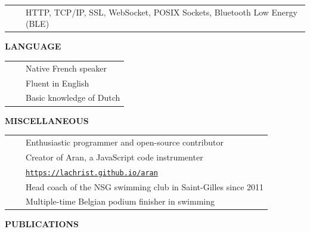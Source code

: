 \documentclass[a4paper,11pt,english]{article}
\newcommand{\LeftColumn}[0]{6.0cm}
\newcommand{\MarginColumn}[0]{28pt}
\newcommand{\RightColumn}[0]{10.5cm}
\newcommand{\Bullet}[0]{\faCaretRight~~}
\newcommand{\Rubric}[1]{\colorbox{gray!20}{\parbox{\linewidth}{\centering\sffamily\bfseries{}#1}}}
\newcommand{\Link}[1]{\href{#1}{\texttt{#1}}}
\begin{document}
\begin{minipage}[t]{\LeftColumn}
\begin{tabularx}{\linewidth}{@{}l@{}>{\raggedright\arraybackslash}X@{}}
\Bullet & HTTP, TCP/IP, SSL, WebSocket, POSIX Sockets, Bluetooth Low Energy (BLE) \\[0pt]
\end{tabularx}

\vspace{12pt}\Rubric{\faLanguage \quad LANGUAGE}\vspace{8pt}

\begin{tabularx}{\linewidth}{@{}l@{}l@{}}
\Bullet & Native French speaker \\[0pt]
\Bullet & Fluent in English \\[0pt]
\Bullet & Basic knowledge of Dutch \\[0pt]
\end{tabularx}

\vspace{12pt}\Rubric{\faPuzzlePiece \quad MISCELLANEOUS}\vspace{8pt}

\begin{tabularx}{\linewidth}{@{}l@{}>{\raggedright\arraybackslash}X@{}}
\Bullet & Enthusiastic programmer and open-source contributor \\[0pt]
\Bullet & Creator of Aran, a JavaScript code instrumenter \\[0pt]
  & {\footnotesize{}\Link{https://lachrist.github.io/aran}} \\[0pt]
\Bullet & Head coach of the NSG swimming club in Saint-Gilles since 2011 \\[0pt]
\Bullet & Multiple-time Belgian podium finisher in swimming \\[0pt]
\end{tabularx}

\end{minipage}
\hspace{\MarginColumn}
\begin{minipage}[t]{\RightColumn}

\Rubric{\faBook \quad PUBLICATIONS}

\printbibliography[heading={none}]

\end{minipage}
\end{document}
